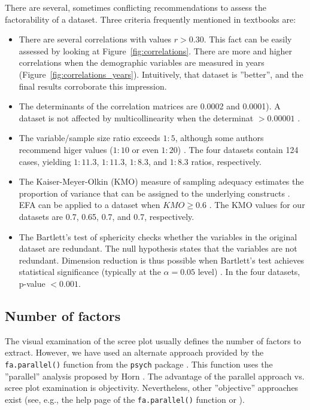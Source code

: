 \documentclass[10pt,conference]{IEEEtran}\usepackage[]{graphicx}\usepackage[table,xcdraw]{xcolor}
\begin{document}
There are several, sometimes conflicting recommendations to assess the factorability of a dataset. Three criteria frequently mentioned in textbooks are:
\begin{itemize}

    \item There are several correlations with values $r > 0.30$. This fact can be easily assessed by looking at Figure~\ref{fig:correlations}. There are more and higher correlations when the demographic variables are measured in years (Figure~\ref{fig:correlations_years}). Intuitively, that dataset is ''better'', and the final results corroborate this impression. 
    
    \item The determinants of the correlation matrices are 0.0002 and 0.0001). A dataset is not affected by multicollinearity when the determinat $> 0.00001$ \cite[Chapter 9]{watkins2020step}.


    \item The variable/sample size ratio exceeds $1:5$, although some authors recommend higer values ($1:10$ or even $1:20$) \cite{watkins2020step}. The four datasets contain 124 cases, yielding 
    $1:11.3$, 
    $1:11.3$, 
    $1:8.3$, and 
    $1:8.3$ ratios, respectively. 

    \item The Kaiser-Meyer-Olkin (KMO) measure of sampling adequacy estimates the proportion of variance that can be assigned to the underlying constructs \cite{watkins2020step}. EFA can be applied to a dataset when $KMO \geq 0.6$ \cite{kaiser1974little}. The KMO values for our datasets are
    0.7,
    0.65,
    0.7, and
    0.7,
    respectively.


    \item The Bartlett's test of sphericity checks whether the variables in the original dataset are redundant. The null hypothesis states that the variables are not redundant. Dimension reduction is thus possible when Bartlett's test achieves statistical significance (typically at the $\alpha = 0.05$ level) \cite{watkins2020step}. In the four datasets, p-value $< 0.001$.
    
\end{itemize}

\subsection{Number of factors}

The visual examination of the scree plot usually defines the number of factors to extract. However, we have used an alternate approach provided by the \lstinline{fa.parallel()} function from the \lstinline{psych} package \cite{psych}. This function uses the ''parallel'' analysis proposed by Horn \cite{horn1965rationale}. The advantage of the parallel approach vs. scree plot examination is objectivity. Nevertheless, other ''objective'' approaches exist (see, e.g., the help page of the \lstinline{fa.parallel()} function or \cite[Chapter 12]{watkins2020step}).
\end{document}
